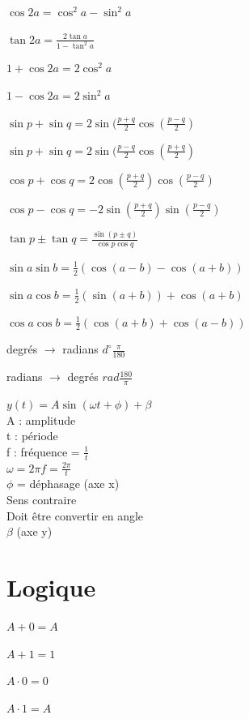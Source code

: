 \documentclass[a4paper,12pt]{article}
\newcommand\tab[1][]{\hspace*{#1}}
\newcommand\Warning{%
 \makebox[1.4em][c]{%
 \makebox[0pt][c]{\raisebox{.1em}{\small!}}%
 \makebox[0pt][c]{\color{red}\Large$\bigtriangleup$}}}%
\begin{document}
$\cos 2a = \cos^2a - \sin^2a$

$\tan 2a = \frac{2\tan a}{1-\tan^2a}$ 

\vspace{\baselineskip}
$1 + \cos 2a = 2\cos^2 a$

$1 - \cos 2a = 2\sin^2 a$

\vspace{\baselineskip}
$\sin p + \sin q = 2\sin(\frac{p+q}{2} \cos(\frac{p-q}{2})$

$\sin p + \sin q = 2\sin(\frac{p-q}{2} \cos(\frac{p+q}{2})$

$\cos p + \cos q = 2\cos(\frac{p+q}{2}) \cos(\frac{p-q}{2})$

$\cos p - \cos q = -2\sin(\frac{p+q}{2}) \sin(\frac{p-q}{2})$

$\tan p \pm \tan q = \frac{\sin(p \pm q)}{\cos p \cos q}$

\newpage
$\sin a \sin b = \frac{1}{2}(\cos(a-b)-\cos(a+b))$

$\sin a \cos b = \frac{1}{2}(\sin(a+b))+\cos(a+b)$

$\cos a \cos b = \frac{1}{2}(\cos(a+b)+\cos(a-b))$

\vspace{\baselineskip}
degrés $\rightarrow$ radians $d^\circ \frac{\pi}{180}$

radians $\rightarrow$ degrés $rad\frac{180}{\pi}$ 

\vspace{\baselineskip}
$y(t) = A\sin(\omega t+\phi ) + \beta$\\
\tab[1cm] A : amplitude \\
\tab[1cm] t : période \\
\tab[1cm] f : fréquence = $\frac{1}{t}$ \\
\tab[1cm] $\omega = 2\pi f = \frac{2\pi}{t}$ \\
\tab[1cm] $\phi$ = déphasage (axe x) \\ 
\tab[2cm]\Warning Sens contraire \\
\tab[2cm]\Warning Doit être convertir en angle\\
\tab[1cm] $\beta$ (axe y)

\newpage
\section{Logique}
$A + 0 = A$

$A + 1 = 1$

$A \cdot 0 = 0$

$A \cdot 1 = A$
\end{document}
